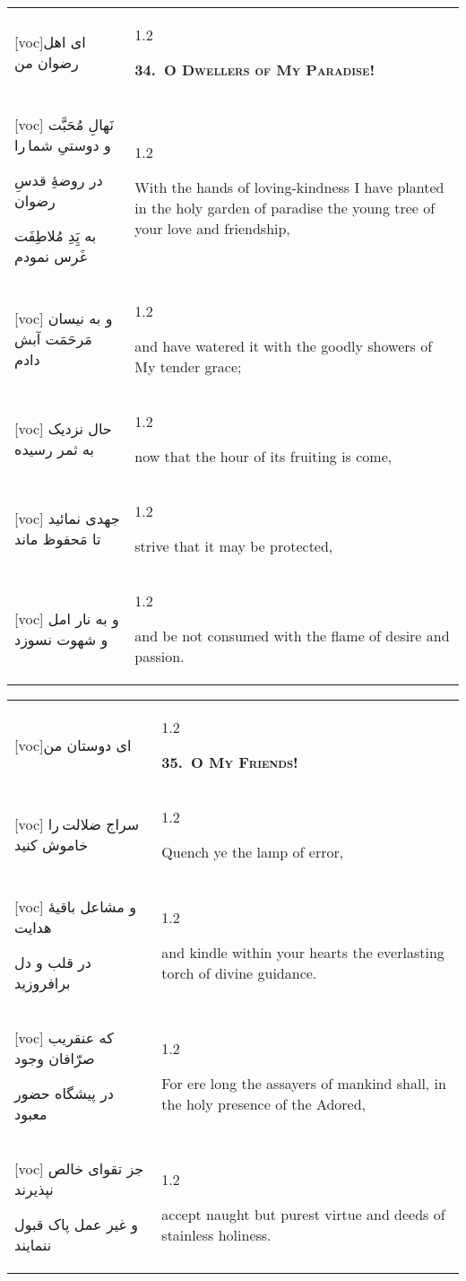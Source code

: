 \documentclass[11pt]{article}
\makeatletter
\newenvironment{orig}
  {\begin{farsi}[voc]}
  {\end{farsi}}
\newenvironment{trans}
  {\Large\begin{spacing}{1.2}\raggedright}
  {\end{spacing}}
\newenvironment{word}
  {\begin{tabular}[t]{p{2.75in}@{\hspace{3em}}p{2.875in}}}
  {\end{tabular}}
\newcommand{\ayat}[2]{\begin{orig}#1\end{orig} & \begin{trans}#2\end{trans}}
\newcommand{\heading}[2]{\textsc{\textbf{#1}} %
}
\makeatother
\begin{document}
\pagebreak

\begin{word}
\ayat{ای اهل رضوان من}{\heading{34.~O Dwellers of My Paradise!}{}} \\ \ayat{
نَهالِ مُحَبَّت و دوستیِ شما را

در روضۀِ قدسِ رضوان

به يَِدِ مُلاطِفَت غَرس نمودم
}{With the hands of loving-kindness I have planted in the holy garden of
  paradise the young tree of your love and friendship,} \vspace{-1ex}\\ \ayat{
و به نيسان مَرحَمَت آبش دادم
}{and have watered it with the goodly showers of My tender grace;} \vspace{-1ex}\\ \ayat{
حال نزديک به ثمر رسيده
}{now that the hour of its fruiting is come,} \vspace{-1ex}\\ \ayat{
جهدی نمائيد تا مَحفوظ ماند
}{strive that it may be protected,} \vspace{-1ex}\\ \ayat{
و به نار امل و شهوت نسوزد
}{and be not consumed with the flame of desire and passion.}
\end{word}

\pagebreak

\begin{word}
\ayat{ای دوستان من}{\heading{35.~O My Friends!}{}} \\ \ayat{
سراج ضلالت را خاموش کنيد
}{Quench ye the lamp of error,} \vspace{-1ex}\\ \ayat{
و مشاعل باقيۀ هدايت

در قلب و دل برافروزيد
}{and kindle within your hearts the everlasting torch of divine
  guidance.} \\ \ayat{
که عنقريب صرّافان وجود

در پيشگاه حضور معبود
}{For ere long the assayers of mankind shall, in the holy presence of the
  Adored,} \vspace{-1ex}\\ \ayat{
جز تقوای خالص نپذيرند

و غير عمل پاک قبول ننمايند
}{accept naught but purest virtue and deeds of stainless holiness.}
\end{word}

\pagebreak
\end{document}
